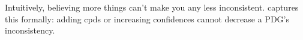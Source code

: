 \documentclass[twoside]{article}
\theoremstyle{plain}
\theoremstyle{definition}
\begin{document}


Intuitively, believing more things can't make you any less inconsistent.
captures this formally: adding cpds or increasing confidences cannot decrease a PDG's inconsistency.
\end{document}
